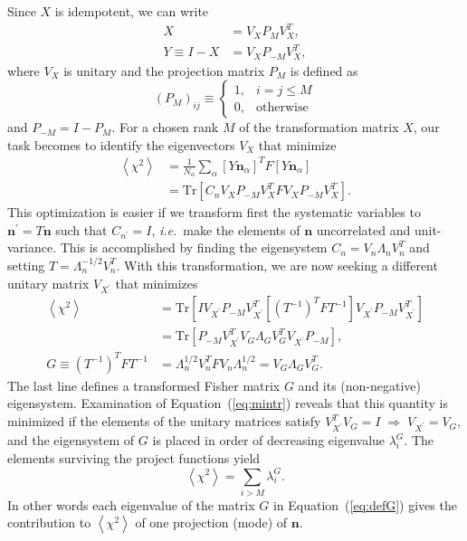 \documentclass[linenumbers, onecolumn]{aastex63}
\newcommand{\ie}{\textit{i.e.}}
\newcommand{\eqq}[1]{Equation~(\ref{#1})}
\newcommand{\vecn}{\ensuremath{\mathbf{n}}}
\newcommand{\covm}{C}
\newcommand{\matF}{F}
\newcommand{\matG}{G}
\newcommand{\matI}{I}
\newcommand{\matT}{T}
\newcommand{\matX}{X}
\newcommand{\matY}{Y}
\newcommand{\matV}{V}
\newcommand{\matLam}{\Lambda}
\newcommand{\proj}{P}  %
\newcommand{\trace}{\text{Tr}}
\begin{document}
Since $\matX$ is idempotent, we can write
\begin{align}
  \matX & = V_X \proj_M V_X^T, \\
  \matY \equiv \matI-\matX & = V_X \proj_{-M} V_X^T,
\end{align}
where $V_X$ is unitary and the projection matrix $\proj_M$ is defined as
\begin{equation}
  \left(\proj_M\right)_{ij} \equiv
\begin{cases}
                                            1,  &  i=j\le M \\
                                            0,  & \text{otherwise}
\end{cases}
\end{equation}
and $\proj_{-M}=\matI-\proj_M.$  For a chosen rank $M$ of the
transformation matrix $X$, our task becomes to identify the
eigenvectors $V_X$ that minimize
\begin{align}
  \left\langle \chi^2\right\rangle & = \frac{1}{N_\alpha} \sum_\alpha
  \left[ \matY \vecn_\alpha\right]^T \matF  \left[\matY
                                     \vecn_\alpha\right] \\
       & = \trace \left[ \covm_n V_X \proj_{-M} V_X^T \matF V_X
         \proj_{-M} V_X^T \right].
\end{align}
This optimization is easier if we transform first the systematic variables to
$\vecn^\prime =\matT\vecn$ such that $\covm_{n^\prime}=\matI$, \ie\
make the elements of $\vecn$ uncorrelated and unit-variance.  This
is accomplished by finding the eigensystem $\covm_n=\matV_n \matLam_n
\matV_n^T$ and setting $\matT = \matLam_n^{-1/2} \matV_n^T$.  With
this transformation, we are now seeking a different unitary matrix
$\matV_{X^\prime}$ that minimizes
\begin{align}
  \left\langle \chi^2\right\rangle & = \trace \left[ \matI
    V_{X^\prime} \proj_{-M} V_{X^\prime}^T \left[ (T^{-1})^T \matF
      T^{-1} \right] V_{X^\prime} 
    \proj_{-M} V_{X^\prime}^T \right] \\
  & = \trace \left[ \proj_{-M} V_{X^\prime}^T \matV_G \matLam_G \matV_G^T
    V_{X^\prime} \proj_{-M} \right],
  \label{eq:mintr}\\
  \matG \equiv \left(T^{-1}\right)^T \matF   T^{-1} & = \matLam_n^{1/2} \matV_n^T
  \matF \matV_n \matLam_n^{1/2} = \matV_G \matLam_G \matV_G^T.
  \label{eq:defG}
\end{align}
The last line defines a transformed Fisher matrix $\matG$ and its
(non-negative) eigensystem.  Examination of \eqq{eq:mintr} reveals that this quantity
is minimized if the elements of the unitary matrices satisfy
$\matV_{X^\prime}^T \matV_G = \matI \; \Rightarrow \; \matV_{X^\prime} = \matV_G,$ and the eigensystem of $G$ is placed
in order of decreasing eigenvalue $\lambda^G_i.$ The
elements surviving the project functions yield
\begin{equation}
  \left\langle \chi^2\right\rangle = \sum_{i>M} \lambda_i^G.
  \label{eq:chiresid}
\end{equation}
In other words each eigenvalue of the matrix $\matG$ in \eqq{eq:defG}
gives the contribution to $\left\langle\chi^2\right\rangle$ of one
projection (mode) of $\vecn.$
\end{document}
